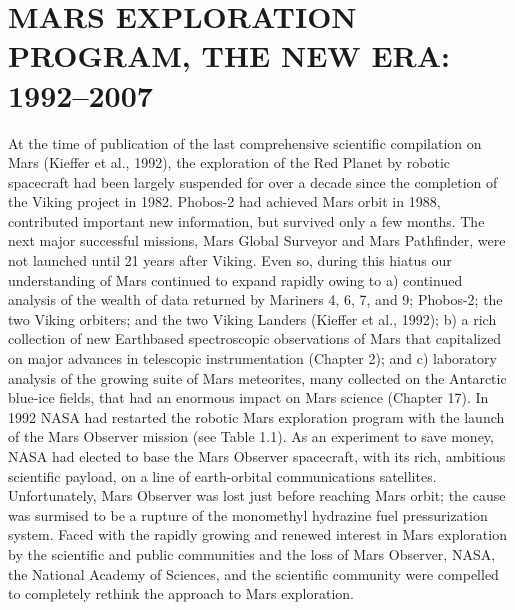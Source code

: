 \section{MARS EXPLORATION PROGRAM, THE
NEW ERA: 1992--2007}
At the time of publication of the last comprehensive scientific
compilation on Mars (Kieffer et al., 1992), the exploration of
the Red Planet by robotic spacecraft had been largely
suspended for over a decade since the completion of the Viking
project in 1982. Phobos-2 had achieved Mars orbit in 1988,
contributed important new information, but survived only a few
months. The next major successful missions, Mars Global
Surveyor and Mars Pathfinder, were not launched until 21 years
after Viking. Even so, during this hiatus our understanding of
Mars continued to expand rapidly owing to a) continued
analysis of the wealth of data returned by Mariners 4, 6, 7, and
9; Phobos-2; the two Viking orbiters; and the two Viking
Landers (Kieffer et al., 1992); b) a rich collection of new Earthbased
spectroscopic observations of Mars that capitalized on
major advances in telescopic instrumentation (Chapter 2); and
c) laboratory analysis of the growing suite of Mars meteorites,
many collected on the Antarctic blue-ice fields, that had an
enormous impact on Mars science (Chapter 17).
In 1992 NASA had restarted the robotic Mars exploration
program with the launch of the Mars Observer mission (see
Table 1.1). As an experiment to save money, NASA had elected
to base the Mars Observer spacecraft, with its rich, ambitious
scientific payload, on a line of earth-orbital communications
satellites. Unfortunately, Mars Observer was lost just before
reaching Mars orbit; the cause was surmised to be a rupture of
the monomethyl hydrazine fuel pressurization system. Faced
with the rapidly growing and renewed interest in Mars exploration
by the scientific and public communities and the loss of
Mars Observer, NASA, the National Academy of Sciences, and
the scientific community were compelled to completely rethink
the approach to Mars exploration.

